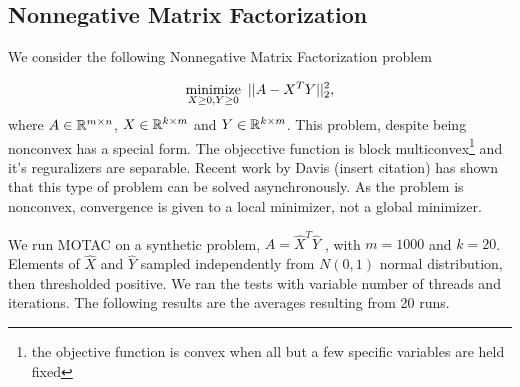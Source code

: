 \subsection{Nonnegative Matrix Factorization}

We consider the following Nonnegative Matrix Factorization problem

\begin{equation*}
	\operatorname*{minimize}_{X \geq 0,Y \geq 0} ~||A-X^T Y||_2^2,
\end{equation*}
where $A \in \mathbb{R}^{m\times n}$, $X \in \mathbb{R}^{k \times m}$ and $Y \in \mathbb{R}^{k \times m}$.
This problem, despite being nonconvex has a special form.
The objecctive function  is block multiconvex\footnote{the objective function is convex when all but a few specific variables are held fixed} and it's reguralizers are separable.
Recent work by Davis (insert citation) has shown that this type of problem can be solved asynchronously.
As the problem is nonconvex, convergence is given to a local minimizer, not a global minimizer.

We run MOTAC on a synthetic problem, $A=\hat X^T \hat Y$ ,  with $m=1000$ and $k=20$.
Elements of $\hat X$ and $\hat Y$ sampled independently from $N(0, 1)$ normal distribution, then thresholded positive.
We ran the tests with variable number of threads and iterations. 
The following results are the averages resulting from 20 runs.


